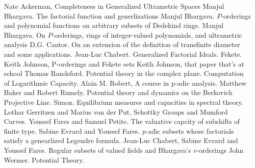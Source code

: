 \documentclass[12pt]{dalthesis}
\theoremstyle{plain}
\theoremstyle{definition}
\begin{document}
\begin{thebibliography}{9}
 Nate Ackerman,  Completeness in Generalized Ultrametric Spaces
 Manjul Bhargava. The factorial function and generlizations
 Manjul Bhargava. $P$-orderings and polynomial functions on arbitrary subsets of Dedekind rings.
 Manjul Bhargava. On $ P$-orderings, rings of integer-valued polynomials, and ultrametric analysis
  D.G. Cantor. On an extension of the definition of transfinite diameter and some applications.  
 Jean-Luc Chabert. Generalized Factorial Ideals.
 Fekete.
 Keith Johnson, P-orderings and Fekete sets
 Keith Johnson, that paper that's at school
 Thomas Randsford. Potential theory in the complex plane.
 Computation of Logarithmic Capacity.
 Alain M. Robert, A course in p-adic analysis.
 Matthew Baker and Robert Rumely. Potential theory and dynamics on the Berkovich Projective Line.
 Simon. Equilibrium measures and capacities in spectral theory.
 Lothar Gerritzen and Marius van der Put, Schottky Groups and Mumford Curves.
 Youssef Fares and Samuel Petite. The valuative capcity of subshifts of finite type.
 Sabine Evrard and Youssef Fares. $p$-adic subsets whose factorials satisfy a genearlized Legendre formula.
 Jean-Luc Chabert, Sabine Evrard and Youssef Fares. Regular subsets of valued fields and Bhargava’s $v$-orderings
 John Wermer. Potential Theory.
\end{thebibliography}
\end{document}
